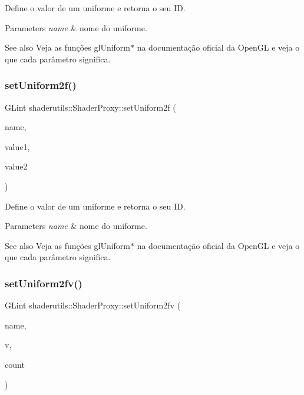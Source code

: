 Define o valor de um uniforme e retorna o seu ID. 
\begin{DoxyParams}{Parameters}
{\em name} & nome do uniforme. \\
\hline
\end{DoxyParams}
\begin{DoxySeeAlso}{See also}
Veja as funções gl\+Uniform$\ast$ na documentação oficial da Open\+GL e veja o que cada parâmetro significa. 
\end{DoxySeeAlso}
\mbox{\label{classshaderutils_1_1_shader_proxy_a9a1b76e005bbf2c1c071069ea2c16e8b}} 
\subsubsection{\texorpdfstring{set\+Uniform2f()}{setUniform2f()}}
{\footnotesize\ttfamily G\+Lint shaderutils\+::\+Shader\+Proxy\+::set\+Uniform2f (\begin{DoxyParamCaption}\item[{const char $\ast$}]{name,  }\item[{G\+Lfloat}]{value1,  }\item[{G\+Lfloat}]{value2 }\end{DoxyParamCaption})\hspace{0.3cm}{\ttfamily [inline]}}

Define o valor de um uniforme e retorna o seu ID. 
\begin{DoxyParams}{Parameters}
{\em name} & nome do uniforme. \\
\hline
\end{DoxyParams}
\begin{DoxySeeAlso}{See also}
Veja as funções gl\+Uniform$\ast$ na documentação oficial da Open\+GL e veja o que cada parâmetro significa. 
\end{DoxySeeAlso}
\mbox{\label{classshaderutils_1_1_shader_proxy_a8681dcd34bcaee0472fdbc836037885f}} 
\subsubsection{\texorpdfstring{set\+Uniform2fv()}{setUniform2fv()}}
{\footnotesize\ttfamily G\+Lint shaderutils\+::\+Shader\+Proxy\+::set\+Uniform2fv (\begin{DoxyParamCaption}\item[{const char $\ast$}]{name,  }\item[{const G\+Lfloat $\ast$}]{v,  }\item[{G\+Luint}]{count }\end{DoxyParamCaption})\hspace{0.3cm}{\ttfamily [inline]}}

